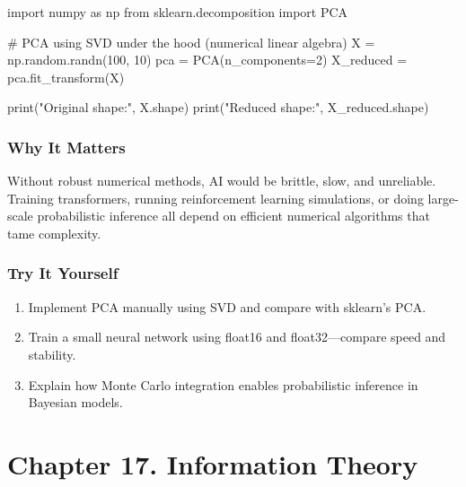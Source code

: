 \documentclass[
  letterpaper,
  DIV=11,
  numbers=noendperiod]{scrreprt}
\newenvironment{Shaded}{\begin{snugshade}}{\end{snugshade}}
\newcommand{\BuiltInTok}[1]{\textcolor[rgb]{0.00,0.23,0.31}{#1}}
\newcommand{\CommentTok}[1]{\textcolor[rgb]{0.37,0.37,0.37}{#1}}
\newcommand{\DecValTok}[1]{\textcolor[rgb]{0.68,0.00,0.00}{#1}}
\newcommand{\ImportTok}[1]{\textcolor[rgb]{0.00,0.46,0.62}{#1}}
\newcommand{\NormalTok}[1]{\textcolor[rgb]{0.00,0.23,0.31}{#1}}
\newcommand{\OperatorTok}[1]{\textcolor[rgb]{0.37,0.37,0.37}{#1}}
\newcommand{\StringTok}[1]{\textcolor[rgb]{0.13,0.47,0.30}{#1}}
\providecommand{\tightlist}{%
  \setlength{\itemsep}{0pt}\setlength{\parskip}{0pt}}
\begin{document}
\begin{Shaded}
\begin{Highlighting}[]
\ImportTok{import}\NormalTok{ numpy }\ImportTok{as}\NormalTok{ np}
\ImportTok{from}\NormalTok{ sklearn.decomposition }\ImportTok{import}\NormalTok{ PCA}

\CommentTok{\# PCA using SVD under the hood (numerical linear algebra)}
\NormalTok{X }\OperatorTok{=}\NormalTok{ np.random.randn(}\DecValTok{100}\NormalTok{, }\DecValTok{10}\NormalTok{)}
\NormalTok{pca }\OperatorTok{=}\NormalTok{ PCA(n\_components}\OperatorTok{=}\DecValTok{2}\NormalTok{)}
\NormalTok{X\_reduced }\OperatorTok{=}\NormalTok{ pca.fit\_transform(X)}

\BuiltInTok{print}\NormalTok{(}\StringTok{"Original shape:"}\NormalTok{, X.shape)}
\BuiltInTok{print}\NormalTok{(}\StringTok{"Reduced shape:"}\NormalTok{, X\_reduced.shape)}
\end{Highlighting}
\end{Shaded}

\subsubsection{Why It Matters}\label{why-it-matters-57}

Without robust numerical methods, AI would be brittle, slow, and
unreliable. Training transformers, running reinforcement learning
simulations, or doing large-scale probabilistic inference all depend on
efficient numerical algorithms that tame complexity.

\subsubsection{Try It Yourself}\label{try-it-yourself-159}

\begin{enumerate}
\def\labelenumi{\arabic{enumi}.}
\tightlist
\item
  Implement PCA manually using SVD and compare with sklearn's PCA.
\item
  Train a small neural network using float16 and float32---compare speed
  and stability.
\item
  Explain how Monte Carlo integration enables probabilistic inference in
  Bayesian models.
\end{enumerate}

\section{Chapter 17. Information
Theory}\label{chapter-17.-information-theory}
\end{document}
